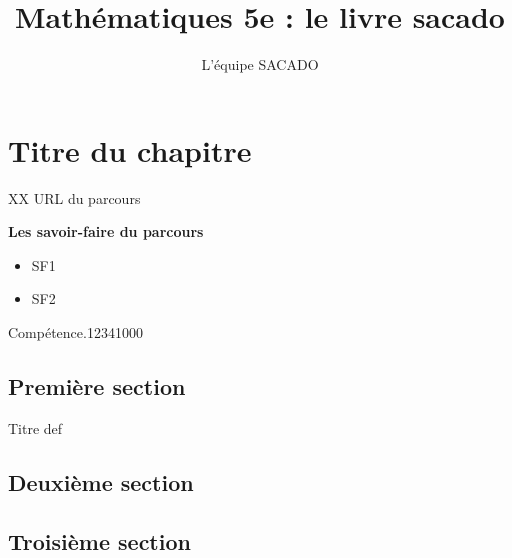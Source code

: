 



\title{Mathématiques 5e  : le livre sacado}
\author{L'équipe SACADO}




\chapter{Titre du chapitre}{XX} %
{URL du parcours}
{
 \begin{CpsCol}
	\textbf{Les savoir-faire du parcours}
 	\begin{itemize}
 		\item SF1
 		\item SF2
 	\end{itemize}
 \end{CpsCol}

\begin{His}
\end{His}

\begin{ExoDec}{Compétence.}{1234}{1}{0}{0}{0}
\end{ExoDec}
}


\begin{pageCours} %


\section{Première section}

\begin{DefT}{Titre def}

\end{DefT}

\section{Deuxième section}

\section{Troisième section}

\end{pageCours} %

